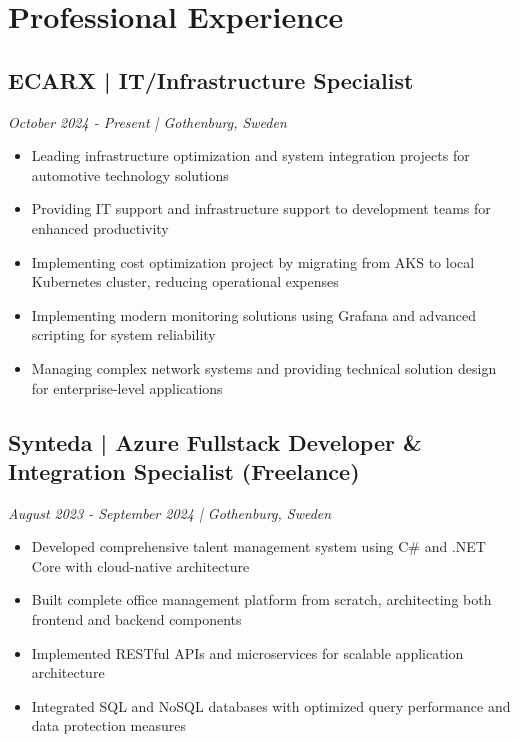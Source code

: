 \documentclass[11pt,a4paper]{article}
\begin{document}
\section*{Professional Experience}

\subsection*{ECARX | IT/Infrastructure Specialist}
\textit{October 2024 - Present | Gothenburg, Sweden}
\begin{itemize}[noitemsep]
\item Leading infrastructure optimization and system integration projects for automotive technology solutions
\item Providing IT support and infrastructure support to development teams for enhanced productivity
\item Implementing cost optimization project by migrating from AKS to local Kubernetes cluster, reducing operational expenses
\item Implementing modern monitoring solutions using Grafana and advanced scripting for system reliability
\item Managing complex network systems and providing technical solution design for enterprise-level applications
\end{itemize}

\subsection*{Synteda | Azure Fullstack Developer \& Integration Specialist (Freelance)}
\textit{August 2023 - September 2024 | Gothenburg, Sweden}
\begin{itemize}[noitemsep]
\item Developed comprehensive talent management system using C\# and .NET Core with cloud-native architecture
\item Built complete office management platform from scratch, architecting both frontend and backend components
\item Implemented RESTful APIs and microservices for scalable application architecture
\item Integrated SQL and NoSQL databases with optimized query performance and data protection measures
\end{itemize}
\end{document}

